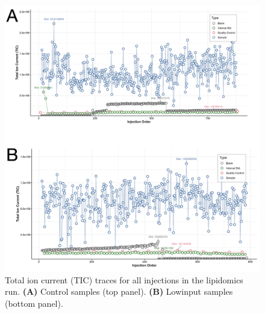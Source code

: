 \documentclass[10pt,letterpaper]{article}
\begin{document}
\begin{figure}[htp]
  \centering
  \includegraphics[width=\textwidth]{fig/supp/SuppFig1.png}
  \caption{
    Total ion current (TIC) traces for all injections in the lipidomics run. 
    {\bf(A)} Control samples (top panel). 
    {\bf(B)} Lowinput samples (bottom panel).
  }
  \label{fig:S1}
\end{figure}
\end{document}

